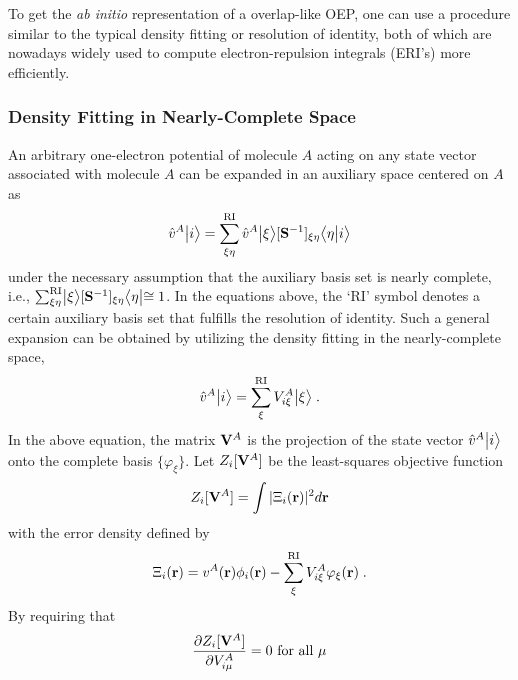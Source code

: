To get the \emph{ab initio} representation of a overlap\hyp{}like OEP, 
one can use a procedure similar to
the typical density fitting or resolution of identity, both of which are nowadays widely used 
to compute electron-repulsion integrals (ERI's) more efficiently. 

\subsubsection{Density Fitting in Nearly-Complete Space}

An arbitrary one-electron potential of molecule $A$ acting on any state vector 
associated with molecule $A$ can be expanded in an auxiliary space centered 
on $A$ as
%
\begin{equation}
   \hat{v}^{A}\Ket{i} = \sum_{\xi\eta}^{\rm RI} \hat{v}^{A}\Ket{\xi} [{\bf S}^{-1}]_{\xi\eta} \BraKet{\eta}{i}
\end{equation}
%
under the necessary assumption that the auxiliary basis set is nearly complete,
i.e., 
$\sum_{\xi\eta}^{\rm RI} \Ket{\xi}[{\bf S}^{-1}]_{\xi\eta} \Bra{\eta} \cong 1$.
In the equations above, 
the `RI' symbol denotes a certain auxiliary basis set that fulfills the resolution of identity. 
Such a general expansion can be obtained by 
utilizing the density fitting
in the nearly\hyp{}complete space,
%
\begin{equation}
 \hat{v}^{A}\Ket{i} = \sum_{\xi}^{\rm RI} V^A_{i\xi} \Ket{\xi} \;.
\end{equation}
%
In the above equation,
the matrix ${\bf V}^A$
is the projection of the state vector $\hat{v}^{A} \Ket{i}$
onto the complete basis $\{ \varphi_\xi \}$.
Let $Z_i[{\bf V}^A]$ be the least\hyp{}squares objective function 
%
\begin{equation} \label{e:z-compl}
 Z_i[{\bf V}^A] = \int \vert \Xi_i({\bf r}) \vert^2 d{\bf r}
\end{equation}
%
with the error density defined by
%
\begin{equation}
 \Xi_i({\bf r}) = v^A({\bf r}) \phi_i({\bf r}) - \sum_\xi^{\rm RI} V^A_{i\xi} \varphi_\xi({\bf r}) \;.
\end{equation}
%
By requiring that
%
\begin{equation} \label{e:z-necessary-requirement}
 \frac{\partial Z_i[{\bf V}^A]}{\partial V^A_{i\mu}} = 0 \text{ for all $\mu$}
\end{equation}

